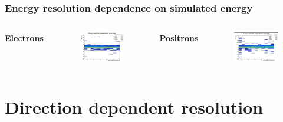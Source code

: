 \documentclass{beamer}
\begin{document}
		\begin{frame}
			\frametitle{Energy resolution dependence on simulated energy}
			\begin{columns}
				\centering
				\Large \textbf{Electrons}
				\begin{figure}
					\centering
					\includegraphics[width = 0.95 \linewidth]{../images/c_e_deltaenergy_energy.png}
				\end{figure}
				\centering
				\Large \textbf{Positrons}
				\begin{figure}
					\centering
					\includegraphics[width = 0.95 \linewidth]{../images/c_p_deltaenergy_energy.png}
				\end{figure}
			\end{columns}
		\end{frame}
		
	\section{Direction dependent resolution}
	
\end{document}
